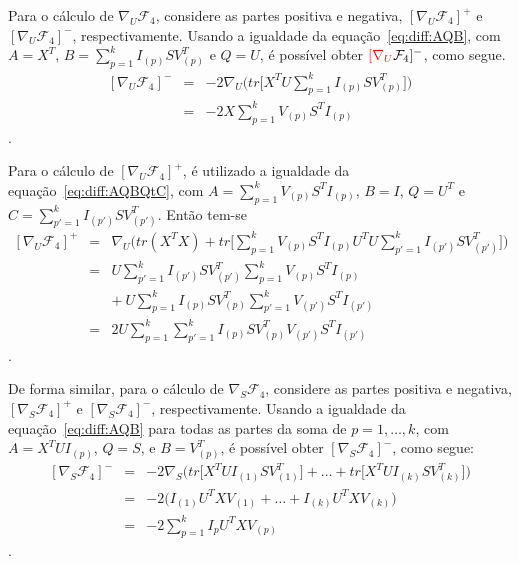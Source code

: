 \documentclass[
    12pt,                %
    oneside,            %
    a4paper,            %
    english,            %
    brazil                %
    ]{abntex2ppgsi}
\begin{document}
Para o cálculo de $\nabla_U \mathcal{F}_4$, considere as partes positiva e negativa, $[\nabla_U \mathcal{F}_4]^+$ e $[\nabla_U \mathcal{F}_4]^-$, respectivamente. Usando a igualdade da equação~\ref{eq:diff:AQB}, com $A = X^T$, $B = \sum_{p=1}^{k}I_{(p)}SV_{(p)}^T$ e $Q = U$, é possível obter $\textcolor{red}{[\nabla_U}\mathcal{F}_4]^-$, como segue.
\[
    \begin{array}{lcl}
        [\nabla_U \mathcal{F}_4]^- & = & - 2 \nabla_U \Big( tr\big[ X^T U \sum_{p=1}^{k}I_{(p)}SV_{(p)}^T \big] \Big) \\
                                   & = & - 2 X \sum_{p=1}^{k} V_{(p)} S^T I_{(p)}
    \end{array}
\].

Para o cálculo de $[\nabla_U \mathcal{F}_4]^+$, é utilizado a igualdade da equação~\ref{eq:diff:AQBQtC}, com $A = \sum_{p=1}^{k} V_{(p)} S^T I_{(p)}$, $B = I$, $Q = U^T$ e $C = \sum_{p'=1}^{k}I_{(p')}SV_{(p')}^T$. Então tem-se
\[
    \begin{array}{lcl}
        [\nabla_U \mathcal{F}_4]^+ & = & \nabla_U \Big( tr(X^TX) + tr\big[ \sum_{p=1}^{k} V_{(p)} S^T I_{(p)} U^T U \sum_{p'=1}^k I_{(p')} S V_{(p')}^T \big] \Big) \\
                                   & = & U \sum_{p'=1}^k I_{(p')} S V_{(p')}^T \sum_{p=1}^{k} V_{(p)} S^T I_{(p)} \\
                                   &   & + ~ U \sum_{p=1}^k I_{(p)} S V_{(p)}^T \sum_{p'=1}^{k} V_{(p')} S^T I_{(p')} \\
                                   & = & 2 U \sum_{p=1}^k \sum_{p'=1}^{k} I_{(p)} S V_{(p)}^T V_{(p')} S^T I_{(p')}
    \end{array}
\].

De forma similar, para o cálculo de $\nabla_S \mathcal{F}_4$, considere as partes positiva e negativa, $[\nabla_S \mathcal{F}_4]^+$ e $[\nabla_S \mathcal{F}_4]^-$, respectivamente. Usando a igualdade da equação~\ref{eq:diff:AQB} para todas as partes da soma de $p = 1, \dots, k$, com $A = X^T U I_{(p)}$, $Q = S$, e $B = V_{(p)}^T$, é possível obter $[\nabla_S \mathcal{F}_4]^-$, como segue:
\[
    \begin{array}{lcl}
        [\nabla_S \mathcal{F}_4]^- & = & - 2 \nabla_S \Big( tr\big[ X^T U I_{(1)}SV_{(1)}^T \big] + \dots + tr\big[ X^T U I_{(k)}SV_{(k)}^T \big] \Big) \\
                                   & = & - 2 \Big( I_{(1)} U^T X V_{(1)} + \dots + I_{(k)} U^T X V_{(k)} \Big) \\
                                   & = & - 2 \sum_{p=1}^{k} I_{p} U^T X V_{(p)}
    \end{array}
\].
\end{document}
